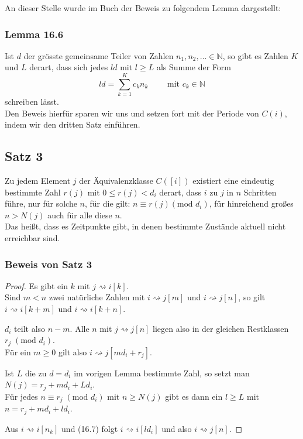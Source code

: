 \documentclass[a4paper]{article}
\begin{document}
An dieser Stelle wurde im Buch der Beweis zu folgendem Lemma dargestellt:

\subsubsection{Lemma 16.6}
Ist $d$ der grösste gemeinsame Teiler von Zahlen $n_1, n_2, ... \in \mathbb{N}$,
so gibt es Zahlen $K$ und $L$ derart, dass sich jedes $ld$ mit $l \geq L$
als Summe der Form
\[
ld = \sum_{k=1}^{K} c_k n_k \qquad
\text{ mit } c_k \in \mathbb{N}
\] 
schreiben lässt.
\\

Den Beweis hierfür sparen wir uns und setzen fort mit der Periode von $C(i)$, indem wir den dritten Satz einführen.

\subsection{Satz 3}

Zu jedem Element $j$ der Äquivalenzklasse $C([i])$ existiert eine eindeutig bestimmte Zahl $r(j)$ mit
$0 \leq r(j) < d_i$ derart, dass $i$ zu $j$ in $n$ Schritten führe, nur für solche $n$, für die gilt:
$n \equiv r(j) (\text{mod } d_i)$, für hinreichend großes $n>N(j)$ auch für alle diese $n$. 
\\

Das heißt, dass es Zeitpunkte
gibt, in denen bestimmte Zustände aktuell nicht erreichbar sind.

\subsubsection{Beweis von Satz 3}

\begin{proof}
	Es gibt ein $k$ mit $j \rightsquigarrow i [k]$.
	\\

	Sind $m<n$ zwei natürliche Zahlen mit $i \rightsquigarrow j[m]$ und
	$i \rightsquigarrow j[n]$, so gilt
	$i \rightsquigarrow i[k+m]$ und $i \rightsquigarrow i[k+n]$.

	$d_i$ teilt also $n - m$. Alle $n$ mit $j \rightsquigarrow j[n]$ liegen also
	in der gleichen Restklassen $r_j \; (\text{mod } d_i)$.
	\\

	Für ein $m \geq 0$ gilt also $i \rightsquigarrow j[m d_i + r_j]$.

	Ist $L$ die zu $d = d_i$ im vorigen Lemma bestimmte Zahl, so setzt man
	$N(j) = r_j + m d_i + L d_i$.
	\\

	Für jedes $n \equiv r_j \; (\text{mod } d_i)$ mit $n \geq N(j)$ gibt
	es dann ein $l \geq L$ mit $n = r_j + m d_i + l d_i$.

	Aus $i \rightsquigarrow i[n_k]$ und (16.7) folgt $i \rightsquigarrow i [l d_i]$
	und also $i \rightsquigarrow j[n]$.
\end{proof}
\end{document}
